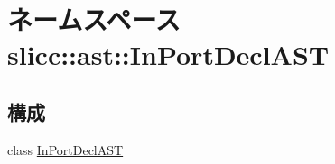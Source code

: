 \hypertarget{namespaceslicc_1_1ast_1_1InPortDeclAST}{
\section{ネームスペース slicc::ast::InPortDeclAST}
\label{namespaceslicc_1_1ast_1_1InPortDeclAST}
}
\subsection*{構成}
\begin{DoxyCompactItemize}
\item 
class \hyperlink{classslicc_1_1ast_1_1InPortDeclAST_1_1InPortDeclAST}{InPortDeclAST}
\end{DoxyCompactItemize}
